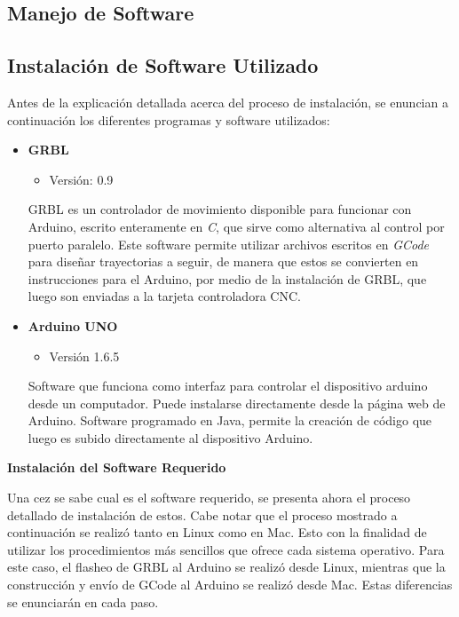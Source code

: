 \documentclass{article}
\begin{document}
\begin{multicols}{2}
{\centering \section{Manejo de Software}}
{\centering \subsection{Instalación de Software Utilizado}}
Antes de la explicación detallada acerca del proceso de instalación, se enuncian a continuación los diferentes programas y software utilizados:
\begin{itemize}
\item \textbf{GRBL}\\
\begin{itemize}
\item Versión: 0.9
\end{itemize}
GRBL es un controlador de movimiento disponible para funcionar con Arduino, escrito enteramente en \textit{C}, que sirve como alternativa al control por puerto paralelo. Este software permite utilizar archivos escritos en \textit{GCode} para diseñar trayectorias a seguir, de manera que estos se convierten en instrucciones para el Arduino, por medio de la instalación de GRBL, que luego son enviadas a la tarjeta controladora CNC.

\item \textbf{Arduino UNO}\\
\begin{itemize}
\item Versión 1.6.5
\end{itemize}
Software que funciona como interfaz para controlar el dispositivo arduino desde un computador. Puede instalarse directamente desde la página web de Arduino. Software programado en Java, permite la creación de código que luego es subido directamente al dispositivo Arduino.

\end{itemize}
\begin{center}
\textbf{Instalación del Software Requerido}
\end{center}
Una cez se sabe cual es el software requerido, se presenta ahora el proceso detallado de instalación de estos. Cabe notar que el proceso mostrado a continuación se realizó tanto en Linux como en Mac. Esto con la finalidad de utilizar los procedimientos más sencillos que ofrece cada sistema operativo. Para este caso, el flasheo de GRBL al Arduino se realizó desde Linux, mientras que la construcción y envío de GCode al Arduino se realizó desde Mac. Estas diferencias se enunciarán en cada paso.


\end{multicols}
\end{document}
